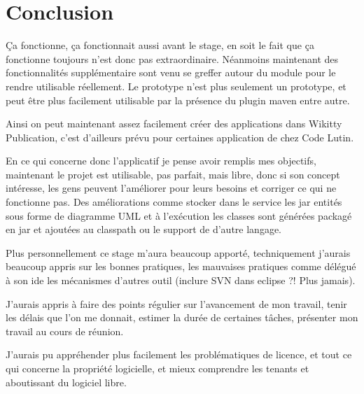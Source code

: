 \section{Conclusion}

Ça fonctionne, ça fonctionnait aussi avant le stage, en soit le fait que ça 
fonctionne toujours n'est donc pas extraordinaire. Néanmoins maintenant des 
fonctionnalités supplémentaire sont venu se greffer autour du module pour le 
rendre utilisable réellement. Le prototype n'est plus seulement un prototype, 
et peut être plus facilement utilisable par la présence du plugin maven entre
autre.

Ainsi on peut maintenant assez facilement créer des applications dans Wikitty
Publication, c'est d'ailleurs prévu pour certaines application de chez Code
Lutin.

En ce qui concerne donc l'applicatif je pense avoir remplis mes objectifs, 
maintenant le projet est utilisable, pas parfait, mais libre, donc si son concept
intéresse, les gens peuvent l'améliorer pour leurs besoins et corriger ce qui ne
fonctionne pas. Des améliorations comme stocker dans le service les jar
entités sous forme de diagramme UML et à l'exécution les classes sont générées 
packagé en jar et ajoutées au classpath ou le support de d'autre langage.

Plus personnellement ce stage m'aura beaucoup apporté, techniquement j'aurais
beaucoup appris sur les bonnes pratiques, les mauvaises pratiques comme délégué
à son ide les mécanismes d'autres outil (inclure SVN dans eclipse ?! Plus jamais).

J'aurais appris à faire des points régulier sur l'avancement de mon travail,
tenir les délais que l'on me donnait, estimer la durée de certaines tâches, 
présenter mon travail au cours de réunion.

J'aurais pu appréhender plus facilement les problématiques de licence, et tout
ce qui concerne la propriété logicielle, et mieux comprendre les tenants et 
aboutissant du logiciel libre.
